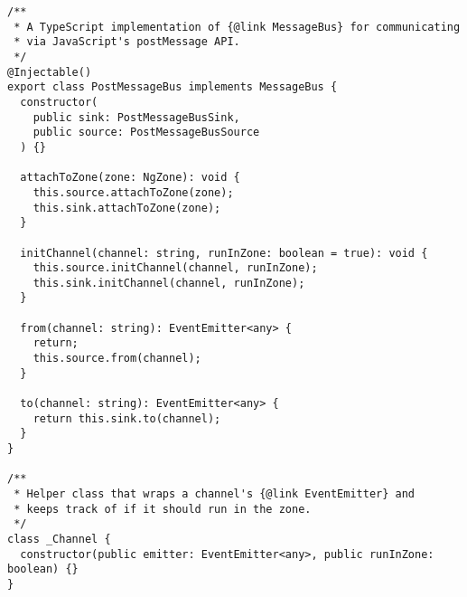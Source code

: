 \begin{verbatim}
/**
 * A TypeScript implementation of {@link MessageBus} for communicating
 * via JavaScript's postMessage API.
 */
@Injectable()
export class PostMessageBus implements MessageBus {
  constructor(
    public sink: PostMessageBusSink,
    public source: PostMessageBusSource
  ) {}

  attachToZone(zone: NgZone): void {
    this.source.attachToZone(zone);
    this.sink.attachToZone(zone);
  }

  initChannel(channel: string, runInZone: boolean = true): void {
    this.source.initChannel(channel, runInZone);
    this.sink.initChannel(channel, runInZone);
  }

  from(channel: string): EventEmitter<any> {
    return;
    this.source.from(channel);
  }

  to(channel: string): EventEmitter<any> {
    return this.sink.to(channel);
  }
}

/**
 * Helper class that wraps a channel's {@link EventEmitter} and
 * keeps track of if it should run in the zone.
 */
class _Channel {
  constructor(public emitter: EventEmitter<any>, public runInZone: boolean) {}
}
\end{verbatim}
